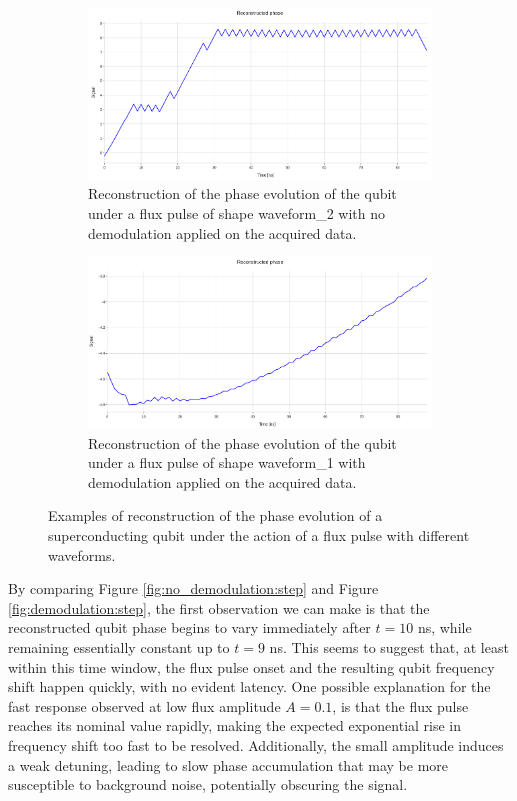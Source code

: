 \begin{figure}[h!]
    \begin{subfigure}[t]{0.45\textwidth}
        \includegraphics[width=\textwidth]{figures/png/Cryoscope/no_demod/long/phase.png}
        \caption{Reconstruction of the phase evolution of the qubit under a flux pulse of shape waveform\_2 with no demodulation applied on the acquired data.}
        \label{fig:no_demodulation:long}
    \end{subfigure}
    \hfill
    \begin{subfigure}[t]{0.45\textwidth}
        \includegraphics[width=\textwidth]{figures/png/Cryoscope/demodulation/long/phase.png}
        \caption{Reconstruction of the phase evolution of the qubit under a flux pulse of shape waveform\_1 with demodulation applied on the acquired data.}
        \label{fig:demodulation:long}
    \end{subfigure}

    \caption{Examples of reconstruction of the phase evolution of a superconducting qubit under the action of a flux pulse with different waveforms.}
    \label{fig:demodulation}
\end{figure}

By comparing Figure \ref{fig:no_demodulation:step} and Figure \ref{fig:demodulation:step}, the first observation we can make is that the reconstructed qubit phase begins to vary immediately after $t=10$ ns, while remaining essentially constant up to $t=9$ ns. 
This seems to suggest that, at least within this time window, the flux pulse onset and the resulting qubit frequency shift happen quickly, with no evident latency.
One possible explanation for the fast response observed at low flux amplitude $A = 0.1$, is that the flux pulse reaches its nominal value rapidly, making the expected exponential rise in frequency shift too fast to be resolved. 
Additionally, the small amplitude induces a weak detuning, leading to slow phase accumulation that may be more susceptible to background noise, potentially obscuring the signal.


